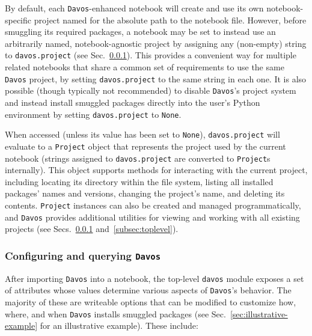 \documentclass[preprint,12pt,a4paper]{elsarticle}
\begin{document}
By default, each \texttt{Davos}-enhanced notebook will create and use its own notebook-specific project named for the absolute path to the notebook file.
However, before smuggling its required packages, a notebook may be set to instead use an arbitrarily named, notebook-agnostic project by assigning any (non-empty) string to \texttt{davos.project} (see Sec.~\ref{subsec:config}).
This provides a convenient way for multiple related notebooks that share a common set of requirements to use the same \texttt{Davos} project, by setting \texttt{davos.project} to the same string in each one.
It is also possible (though typically not recommended) to disable \texttt{Davos}'s project system and instead install smuggled packages directly into the user's Python environment by setting \texttt{davos.project} to \texttt{None}.

When accessed (unless its value has been set to \texttt{None}), \texttt{davos.project} will evaluate to a \texttt{Project} object that represents the project used by the current notebook (strings assigned to \texttt{davos.project} are converted to \texttt{Project}s internally). This object supports methods for interacting with the current project, including locating its directory within the file system, listing all installed packages' names and versions, changing the project's name, and deleting its contents.
\texttt{Project} instances can also be created and managed programmatically, and \texttt{Davos} provides additional utilities for viewing and working with all existing projects (see Secs.~\ref{subsec:config} and~\ref{subsec:toplevel}).


\subsubsection{Configuring and querying \texttt{Davos}}\label{subsec:config}

After importing \texttt{Davos} into a notebook, the top-level \texttt{davos} module exposes a set of attributes whose values determine various aspects of \texttt{Davos}'s behavior.
The majority of these are writeable options that can be modified to customize how, where, and when \texttt{Davos} installs smuggled packages (see Sec.~\ref{sec:illustrative-example} for an illustrative example).
These include:
\end{document}
